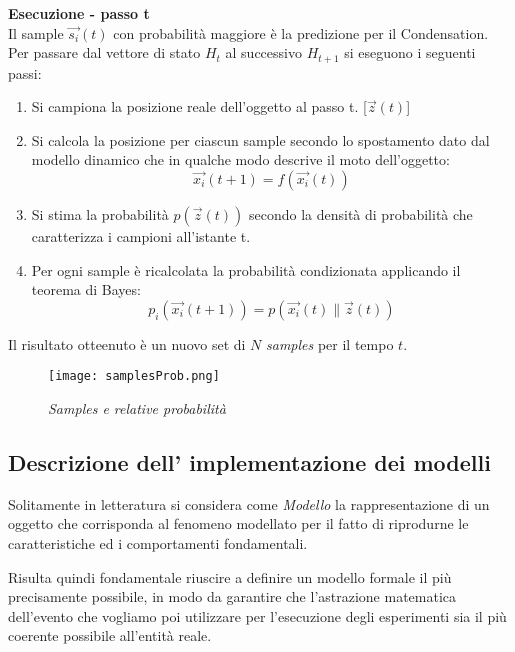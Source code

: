 \textbf{Esecuzione - passo t}\\
Il sample $\overrightarrow{s_i}(t)$ con probabilità maggiore è la predizione per il Condensation.\\

Per passare dal vettore di stato $H_{t}$ al successivo $H_{t+1}$ si eseguono i seguenti passi:
\begin{enumerate}
\item Si campiona la posizione reale dell'oggetto al passo t. [$\overrightarrow{z}(t)$]
\item Si calcola la posizione per ciascun sample secondo lo spostamento dato dal modello dinamico che in qualche modo descrive il moto dell'oggetto: 
\begin{equation}
	\overrightarrow{x_i}(t+1)= f(\overrightarrow{x_i}(t))
\end{equation}
\item Si stima la probabilità $p(\overrightarrow{z}(t))$ secondo la densità di probabilità che caratterizza i campioni all'istante t.
\item Per ogni sample è ricalcolata la probabilità condizionata applicando il teorema di Bayes:
\begin{equation}
	p_i(\overrightarrow{x_i}(t+1))= p(\overrightarrow{x_i}(t)\|\overrightarrow{z}(t))
\end{equation}
\end{enumerate}

Il risultato otteenuto è un nuovo set di $N$ \textit{samples} per il tempo $t$.

\begin{figure}[hb]
\centering
	\texttt{[image: samplesProb.png]}
\caption{\textit{Samples e relative probabilità}\label{fig:samplesProb}}
\end{figure}


\subsection{Descrizione dell' implementazione dei modelli} \label{sec:modelli}
Solitamente in letteratura si considera come \textit{Modello} la rappresentazione di un oggetto che corrisponda al fenomeno modellato per il fatto  di riprodurne le caratteristiche ed i comportamenti fondamentali. 

Risulta quindi fondamentale riuscire a definire un modello formale il più precisamente possibile, in modo da garantire che l'astrazione matematica dell'evento che vogliamo poi utilizzare per l'esecuzione degli esperimenti sia il più coerente possibile all'entità reale. 

